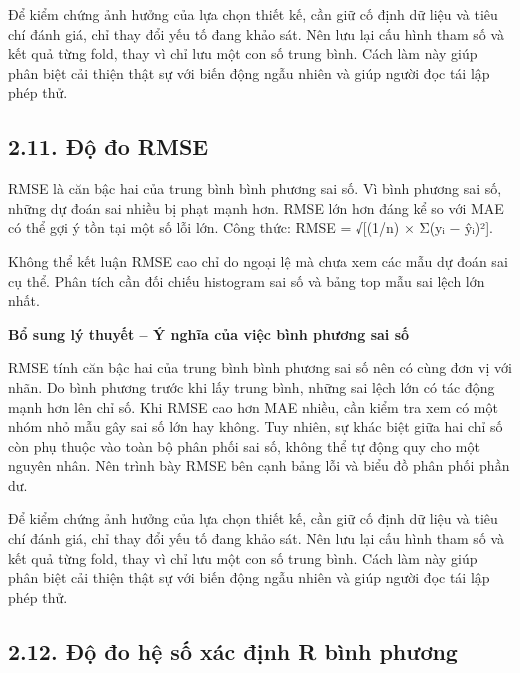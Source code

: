 \documentclass[12pt,a4paper,oneside]{article}
\begin{document}
Để kiểm chứng ảnh hưởng của lựa chọn thiết kế, cần giữ cố định dữ liệu và tiêu chí đánh giá, chỉ thay đổi yếu tố đang khảo sát. Nên lưu lại cấu hình tham số và kết quả từng fold, thay vì chỉ lưu một con số trung bình. Cách làm này giúp phân biệt cải thiện thật sự với biến động ngẫu nhiên và giúp người đọc tái lập phép thử.\par

\subsection*{2.11. Độ đo RMSE}

RMSE là căn bậc hai của trung bình bình phương sai số. Vì bình phương
sai số, những dự đoán sai nhiều bị phạt mạnh hơn. RMSE lớn hơn đáng kể
so với MAE có thể gợi ý tồn tại một số lỗi lớn. Công thức: RMSE =
√{[}(1/n) × Σ(yᵢ − ŷᵢ)²{]}.

Không thể kết luận RMSE cao chỉ do ngoại lệ mà chưa xem các mẫu dự đoán
sai cụ thể. Phân tích cần đối chiếu histogram sai số và bảng top mẫu sai
lệch lớn nhất.


\par\noindent\textbf{Bổ sung lý thuyết -- Ý nghĩa của việc bình phương sai số}\par
RMSE tính căn bậc hai của trung bình bình phương sai số nên có cùng đơn vị với nhãn. Do bình phương trước khi lấy trung bình, những sai lệch lớn có tác động mạnh hơn lên chỉ số. Khi RMSE cao hơn MAE nhiều, cần kiểm tra xem có một nhóm nhỏ mẫu gây sai số lớn hay không. Tuy nhiên, sự khác biệt giữa hai chỉ số còn phụ thuộc vào toàn bộ phân phối sai số, không thể tự động quy cho một nguyên nhân. Nên trình bày RMSE bên cạnh bảng lỗi và biểu đồ phân phối phần dư.\par

Để kiểm chứng ảnh hưởng của lựa chọn thiết kế, cần giữ cố định dữ liệu và tiêu chí đánh giá, chỉ thay đổi yếu tố đang khảo sát. Nên lưu lại cấu hình tham số và kết quả từng fold, thay vì chỉ lưu một con số trung bình. Cách làm này giúp phân biệt cải thiện thật sự với biến động ngẫu nhiên và giúp người đọc tái lập phép thử.\par

\subsection*{2.12. Độ đo hệ số xác định R bình phương}
\end{document}
